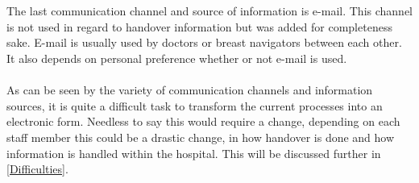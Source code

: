 \\ \\
The last communication channel and source of information is e-mail. This channel is not used in regard to handover information but was added for completeness sake. E-mail is usually used by doctors or breast navigators between each other. It also depends on personal preference whether or not e-mail is used. 
\\ \\
As can be seen by the variety of communication channels and information sources, it is quite a difficult task to transform the current processes into an electronic form. Needless to say this would require a change, depending on each staff member this could be a drastic change, in how handover is done and how information is handled within the hospital. This will be discussed further in \ref{Difficulties}.

